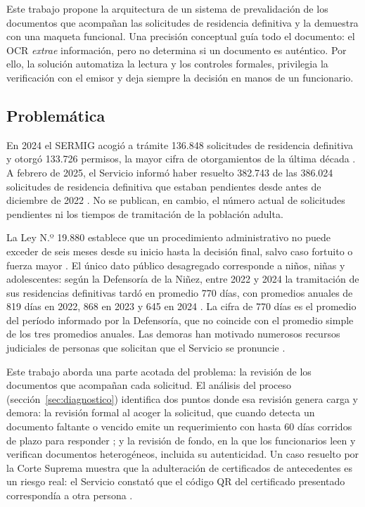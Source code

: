 \documentclass[11pt,a4paper]{article}
\begin{document}
Este trabajo propone la arquitectura de un sistema de prevalidación de los documentos que acompañan las solicitudes de residencia definitiva y la demuestra con una maqueta funcional. Una precisión conceptual guía todo el documento: el OCR \emph{extrae} información, pero no determina si un documento es auténtico. Por ello, la solución automatiza la lectura y los controles formales, privilegia la verificación con el emisor y deja siempre la decisión en manos de un funcionario.

\subsection{Problemática}
\label{sec:problema}
En 2024 el SERMIG acogió a trámite 136.848 solicitudes de residencia definitiva y otorgó 133.726 permisos, la mayor cifra de otorgamientos de la última década \cite{sermig2025}. A febrero de 2025, el Servicio informó haber resuelto 382.743 de las 386.024 solicitudes de residencia definitiva que estaban pendientes desde antes de diciembre de 2022 \cite{sermigavances}. No se publican, en cambio, el número actual de solicitudes pendientes ni los tiempos de tramitación de la población adulta.

La Ley N.º 19.880 establece que un procedimiento administrativo no puede exceder de seis meses desde su inicio hasta la decisión final, salvo caso fortuito o fuerza mayor \cite{ley19880}. El único dato público desagregado corresponde a niños, niñas y adolescentes: según la Defensoría de la Niñez, entre 2022 y 2024 la tramitación de sus residencias definitivas tardó en promedio 770 días, con promedios anuales de 819 días en 2022, 868 en 2023 y 645 en 2024 \cite{defensoria2026}. La cifra de 770 días es el promedio del período informado por la Defensoría, que no coincide con el promedio simple de los tres promedios anuales. Las demoras han motivado numerosos recursos judiciales de personas que solicitan que el Servicio se pronuncie \cite{latercera2023}.

Este trabajo aborda una parte acotada del problema: la revisión de los documentos que acompañan cada solicitud. El análisis del proceso (sección~\ref{sec:diagnostico}) identifica dos puntos donde esa revisión genera carga y demora: la revisión formal al acoger la solicitud, que cuando detecta un documento faltante o vencido emite un requerimiento con hasta 60 días corridos de plazo para responder \cite{sermigrd}; y la revisión de fondo, en la que los funcionarios leen y verifican documentos heterogéneos, incluida su autenticidad. Un caso resuelto por la Corte Suprema muestra que la adulteración de certificados de antecedentes es un riesgo real: el Servicio constató que el código QR del certificado presentado correspondía a otra persona \cite{cs2026}.
\end{document}
